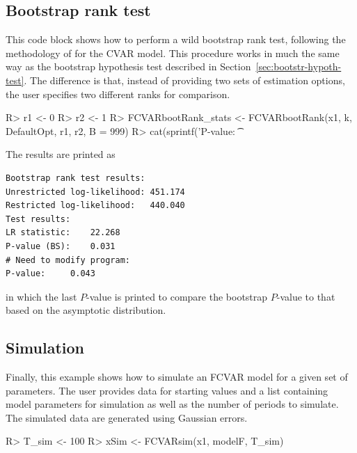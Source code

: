 \documentclass[article]{jss}
\begin{document}
\subsection{Bootstrap rank test}
\label{sec:bootstrap-rank-test}

This code block
shows how to perform a wild bootstrap rank test, following the methodology of \cite{Cavaliere2010} for the CVAR model. This procedure works in much the same way as the bootstrap hypothesis test described in Section~\ref{sec:bootstr-hypoth-test}. The difference is that, instead of providing two sets of estimation options, the user specifies two different ranks for comparison.

\begin{Code}
R> r1 <- 0
R> r2 <- 1
R> FCVARbootRank_stats <- FCVARbootRank(x1, k, DefaultOpt, r1, r2, B = 999)
R> cat(sprintf('P-value: \t %
\end{Code}

The results are printed as
\begin{verbatim}
Bootstrap rank test results:
Unrestricted log-likelihood: 451.174
Restricted log-likelihood:   440.040
Test results:
LR statistic: 	 22.268
P-value (BS): 	 0.031
# Need to modify program:
P-value: 	 0.043
\end{verbatim}
in which the last $P$-value is printed to compare the bootstrap $P$-value to that based on the asymptotic distribution. 

\subsection{Simulation}
\label{sec:simulation}

Finally, 
this example
shows how to simulate an FCVAR model for a given set of parameters. The user provides data for starting values and a list containing model parameters for simulation as well as the number of periods to simulate. The simulated data are generated using Gaussian errors.

\begin{Code}
R> T_sim <- 100
R> xSim <- FCVARsim(x1, modelF, T_sim)
\end{Code}
\end{document}
